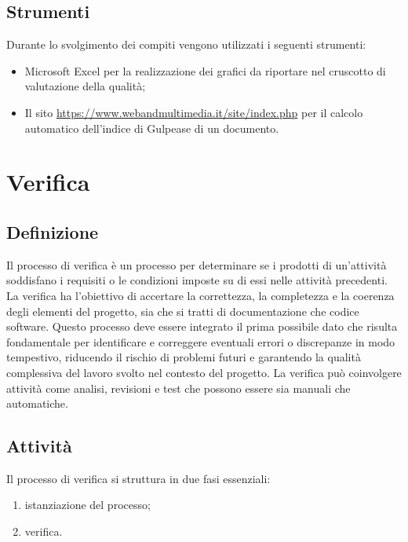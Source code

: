 \subsection{Strumenti}
Durante lo svolgimento dei compiti vengono utilizzati i seguenti strumenti:
\begin{itemize}
    \item Microsoft Excel per la realizzazione dei grafici da riportare nel cruscotto di valutazione della qualità;
    \item Il sito \url{https://www.webandmultimedia.it/site/index.php} per il calcolo automatico dell'indice di Gulpease di un documento.
\end{itemize}
\newpage


\section{Verifica} \label{sec:verifica}
\subsection{Definizione}
Il processo di verifica è un processo per determinare se i prodotti di un'attività soddisfano i requisiti o le condizioni imposte su di essi nelle attività precedenti. La verifica ha l'obiettivo di accertare la correttezza, la completezza e la coerenza degli elementi del progetto, sia che si tratti di documentazione che codice software. Questo processo deve essere integrato il prima possibile dato che risulta fondamentale per identificare e correggere eventuali errori o discrepanze in modo tempestivo, riducendo il rischio di problemi futuri e garantendo la qualità complessiva del lavoro svolto nel contesto del progetto. La verifica può coinvolgere attività come analisi, revisioni e test che possono essere sia manuali che automatiche.

\subsection{Attività}
Il processo di verifica si struttura in due fasi essenziali:

\begin{enumerate}
    \item istanziazione del processo;
    \item verifica. 
    
\end{enumerate}
